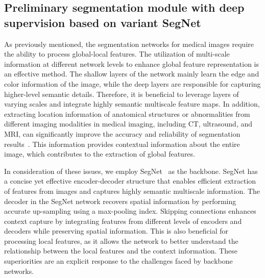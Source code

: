 \documentclass[review]{elsarticle}
\begin{document}
	\subsection{Preliminary segmentation module with deep supervision based on variant SegNet} 
	As previously mentioned, the segmentation networks for medical images require the ability to process global-local features. The utilization of multi-scale information at different network levels to enhance global feature representation is an effective method. The shallow layers of the network mainly learn the edge and color information of the image, while the deep layers are responsible for capturing higher-level semantic details. Therefore, it is beneficial to leverage layers of varying scales and integrate highly semantic multiscale feature maps. In addition, extracting location information of anatomical structures or abnormalities from different imaging modalities in medical imaging, including CT, ultrasound, and MRI, can significantly improve the accuracy and reliability of segmentation results~\cite{aljabri2022review}. This information provides contextual information about the entire image, which contributes to the extraction of global features.
	
	In consideration of these issues, we employ SegNet~\cite{badrinarayanan2017segnet} as the backbone. SegNet has a concise yet effective encoder-decoder structure that enables efficient extraction of features from images and captures highly semantic multiscale information. The decoder in the SegNet network recovers spatial information by performing accurate up-sampling using a max-pooling index. Skipping connections enhances context capture by integrating features from different levels of encoders and decoders while preserving spatial information. This is also beneficial for processing local features, as it allows the network to better understand the relationship between the local features and the context information. These superiorities are an explicit response to the challenges faced by backbone networks. 
	
\end{document}
